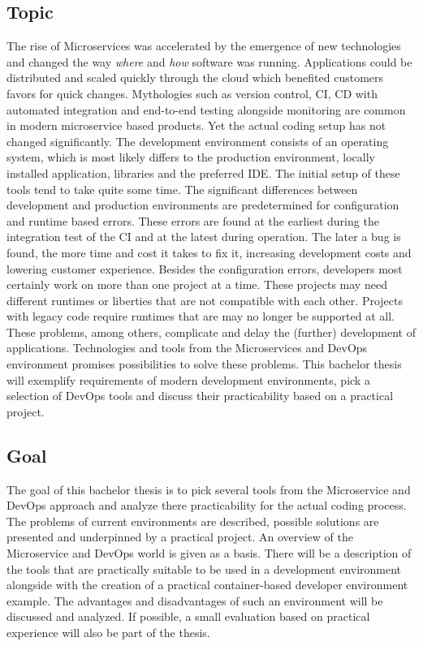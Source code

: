 \documentclass[12pt, a4paper]{article}
\begin{document}
\subsection{Topic}
The rise of Microservices was accelerated by the emergence of new technologies and changed the way \textit{where} and \textit{how} software was running. Applications could be distributed and scaled quickly through the cloud which benefited customers favors for quick changes. Mythologies such as version control, \ac*{CI}, \ac*{CD} with automated integration and end-to-end testing alongside monitoring are common in modern microservice based products. Yet the actual coding setup has not changed significantly. The development environment consists of an operating system, which is most likely differs to the production environment, locally installed application, libraries and the preferred \ac{IDE}. The initial setup of these tools tend to take quite some time. The significant differences between development and production environments are predetermined for configuration and runtime based errors. These errors are found at the earliest during the integration test of the CI and at the latest during operation. The later a bug is found, the more time and cost it takes to fix it, increasing development costs and lowering customer experience.\newline
Besides the configuration errors, developers most certainly work on more than one project at a time. These projects may need different runtimes or liberties that are not compatible with each other. Projects with legacy code require runtimes that are may no longer be supported at all.\newline
These problems, among others, complicate and delay the (further) development of applications. Technologies and tools from the Microservices and DevOps environment promises possibilities to solve these problems. This bachelor thesis will exemplify requirements of modern development environments, pick a selection of DevOps tools and discuss their practicability based on a practical project.
\subsection{Goal}
The goal of this bachelor thesis is to pick several tools from the Microservice and DevOps approach and analyze there practicability for the actual coding process. The problems of current environments are described, possible solutions are presented and underpinned by a practical project.  An overview of the Microservice and DevOps world is given as a basis. There will be a description of the tools that are practically suitable to be used in a development environment alongside with the creation of a practical container-based developer environment example. The advantages and disadvantages of such an environment will be discussed and analyzed. If possible, a small evaluation based on practical experience will also be part of the thesis.
\end{document}
